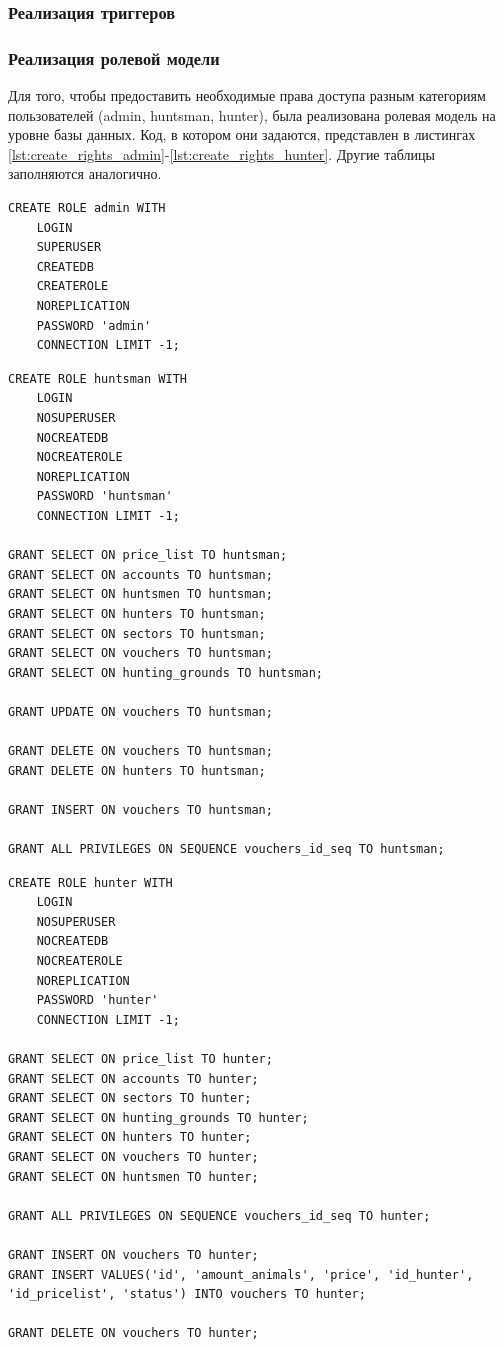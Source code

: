 		
		\subsubsection{Реализация триггеров}
		\subsubsection{Реализация ролевой модели}
		Для того, чтобы предоставить необходимые права доступа разным категориям пользователей (admin, huntsman, hunter), была реализована ролевая модель на уровне базы данных. Код, в котором они задаются, представлен в листингах \ref{lst:create_rights_admin}-\ref{lst:create_rights_hunter}. Другие таблицы заполняются аналогично.
		
		\begin{lstlisting}[caption = {Создание админа}, label=lst:create_rights_admin]
CREATE ROLE admin WITH
	LOGIN
	SUPERUSER
	CREATEDB
	CREATEROLE
	NOREPLICATION
	PASSWORD 'admin'
	CONNECTION LIMIT -1;
		\end{lstlisting}
	
		\begin{lstlisting}[caption = {Создание huntsman и задание прав}, label=lst:create_rights_huntsman]
CREATE ROLE huntsman WITH
	LOGIN
	NOSUPERUSER
	NOCREATEDB
	NOCREATEROLE
	NOREPLICATION
	PASSWORD 'huntsman'
	CONNECTION LIMIT -1;
	
GRANT SELECT ON price_list TO huntsman;
GRANT SELECT ON accounts TO huntsman;
GRANT SELECT ON huntsmen TO huntsman;
GRANT SELECT ON hunters TO huntsman;
GRANT SELECT ON sectors TO huntsman;
GRANT SELECT ON vouchers TO huntsman;
GRANT SELECT ON hunting_grounds TO huntsman;

GRANT UPDATE ON vouchers TO huntsman;

GRANT DELETE ON vouchers TO huntsman;
GRANT DELETE ON hunters TO huntsman;

GRANT INSERT ON vouchers TO huntsman;

GRANT ALL PRIVILEGES ON SEQUENCE vouchers_id_seq TO huntsman;
		\end{lstlisting}
	
		\begin{lstlisting}[caption = {Создание hunter и задание прав}, label=lst:create_rights_hunter]
CREATE ROLE hunter WITH
	LOGIN
	NOSUPERUSER
	NOCREATEDB
	NOCREATEROLE
	NOREPLICATION
	PASSWORD 'hunter'
	CONNECTION LIMIT -1;
	
GRANT SELECT ON price_list TO hunter;
GRANT SELECT ON accounts TO hunter;
GRANT SELECT ON sectors TO hunter;
GRANT SELECT ON hunting_grounds TO hunter;
GRANT SELECT ON hunters TO hunter;
GRANT SELECT ON vouchers TO hunter;
GRANT SELECT ON huntsmen TO hunter;

GRANT ALL PRIVILEGES ON SEQUENCE vouchers_id_seq TO hunter;

GRANT INSERT ON vouchers TO hunter;
GRANT INSERT VALUES('id', 'amount_animals', 'price', 'id_hunter', 'id_pricelist', 'status') INTO vouchers TO hunter;

GRANT DELETE ON vouchers TO hunter;
		\end{lstlisting}
		
